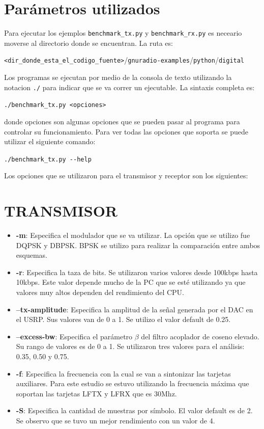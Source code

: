 \section{Par\'ametros utilizados}

Para ejecutar los ejemplos \verb|benchmark_tx.py| y \verb|benchmark_rx.py| es neceario moverse al
directorio donde se encuentran. La ruta es:
\begin{center}
\verb|<dir_donde_esta_el_codigo_fuente>|/\verb|gnuradio-examples|/\verb|python|/\verb|digital|
\end{center}
Los programas se ejecutan por medio de la consola de texto utilizando la notacion \verb|./| para
indicar que se va correr un ejecutable. La sintaxis completa es:
\begin{center}
\verb|./benchmark_tx.py <opciones>|
\end{center}
donde opciones son algunas opciones que se pueden pasar al programa para controlar su
funcionamiento. Para ver todas las opciones que soporta se puede utilizar el siguiente comando:
\begin{center}
\verb|./benchmark_tx.py --help|
\end{center}

Los opciones que se utilizaron para el transmisor y receptor son los siguientes:

\section*{TRANSMISOR}
\begin{itemize}
  \item \textbf{-m}: Especifica el modulador que se va utilizar. La opci\'on que se utilizo fue
  DQPSK y DBPSK. BPSK se utilizo para realizar la comparaci\'on entre ambos esquemas.
  \item \textbf{-r}: Especifica la taza de bits. Se utilizaron varios valores desde 100kbps hasta
  10kbps. Este valor depende mucho de la PC que se est\'e utilizando ya que valores muy altos
  dependen del rendimiento del CPU.
  \item \textbf{--tx-amplitude}: Especifica la amplitud de la se\~nal generada por el DAC en el
  USRP. Sus valores van de 0 a 1. Se utilizo el valor default de 0.25.
  \item \textbf{--excess-bw}: Especifica el par\'ametro $\beta$ del filtro acoplador de coseno
  elevado. Su rango de valores es de 0 a 1. Se utilizaron tres valores para el an\'alisis: 0.35,
  0.50 y 0.75.
  \item \textbf{-f}: Especifica la frecuencia con la cual se van a sintonizar las tarjetas
  auxiliares. Para este estudio se estuvo utilizando la frecuencia m\'axima que soportan las
  tarjetas LFTX y LFRX que es 30Mhz.
  \item \textbf{-S}: Especifica la cantidad de muestras por s\'imbolo. El valor default es de 2. Se
  observo que se tuvo un mejor rendimiento con un valor de 4.
\end{itemize}

